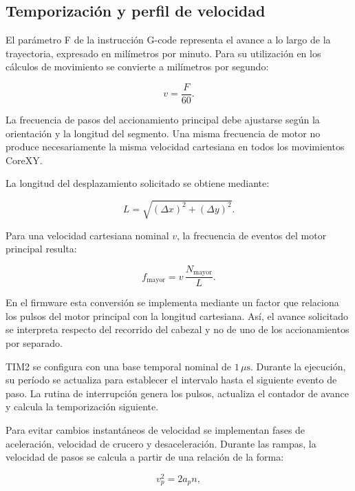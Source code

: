 \documentclass[blue,fullpaper]{ludusofficial}  %
\begin{document}
\subsection{Temporización y perfil de velocidad}

El parámetro F de la instrucción G-code representa
el avance a lo largo de la trayectoria, expresado
en milímetros por minuto. Para su utilización
en los cálculos de movimiento se convierte
a milímetros por segundo:

\begin{equation}
    v = \frac{F}{60}.
\end{equation}

La frecuencia de pasos del accionamiento principal
debe ajustarse según la orientación y la longitud
del segmento. Una misma frecuencia de motor no
produce necesariamente la misma velocidad cartesiana
en todos los movimientos CoreXY.

La longitud del desplazamiento solicitado se obtiene
mediante:

\begin{equation}
    L = \sqrt{(\Delta x)^2 + (\Delta y)^2}.
\end{equation}

Para una velocidad cartesiana nominal $v$, la
frecuencia de eventos del motor principal resulta:

\begin{equation}
    f_{\mathrm{mayor}} =
    v\,\frac{N_{\mathrm{mayor}}}{L}.
    \label{eq:frecuencia-corexy}
\end{equation}

En el firmware esta conversión se implementa
mediante un factor que relaciona los pulsos
del motor principal con la longitud cartesiana.
Así, el avance solicitado se interpreta respecto
del recorrido del cabezal y no de uno de los
accionamientos por separado.

TIM2 se configura con una base temporal nominal
de $1\,\mu\mathrm{s}$. Durante la ejecución,
su período se actualiza para establecer
el intervalo hasta el siguiente evento de paso.
La rutina de interrupción genera los pulsos,
actualiza el contador de avance y calcula
la temporización siguiente.

Para evitar cambios instantáneos de velocidad
se implementan fases de aceleración, velocidad
de crucero y desaceleración. Durante las rampas,
la velocidad de pasos se calcula a partir
de una relación de la forma:

\begin{equation}
    v_p^2 = 2a_p n,
\end{equation}
\end{document}
